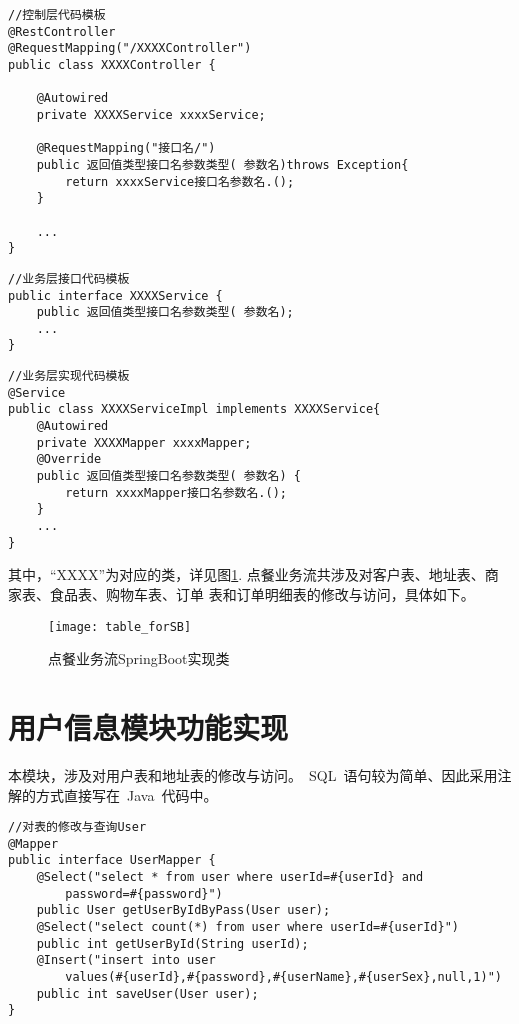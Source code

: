 \begin{lstlisting}[basicstyle=\footnotesize]
//控制层代码模板
@RestController
@RequestMapping("/XXXXController")
public class XXXXController {
    
    @Autowired
    private XXXXService xxxxService;

    @RequestMapping("接口名/")
    public 返回值类型接口名参数类型( 参数名)throws Exception{
        return xxxxService接口名参数名.();
    }
    
    ...
}
\end{lstlisting}

\begin{lstlisting}[basicstyle=\footnotesize]
//业务层接口代码模板
public interface XXXXService {
    public 返回值类型接口名参数类型( 参数名);
    ...
}
\end{lstlisting}

\begin{lstlisting}[basicstyle=\footnotesize]
//业务层实现代码模板
@Service
public class XXXXServiceImpl implements XXXXService{
    @Autowired
    private XXXXMapper xxxxMapper;
    @Override
    public 返回值类型接口名参数类型( 参数名) {
        return xxxxMapper接口名参数名.();
    }
    ...
}
\end{lstlisting}

其中，“XXXX”为对应的类，详见图\ref{fig:table_forSB}.
点餐业务流共涉及对客户表、地址表、商家表、食品表、购物车表、订单
表和订单明细表的修改与访问，具体如下。

\begin{figure}[htbp]
    \centering
    \texttt{[image: table\_forSB]}
    \caption{点餐业务流SpringBoot实现类}\label{fig:table_forSB}
    \vspace{\baselineskip}
\end{figure}

\section{用户信息模块功能实现}
本模块，涉及对用户表和地址表的修改与访问。~SQL~语句较为简单、因此采用注解的方式直接写在~Java~代码中。

\begin{lstlisting}[basicstyle=\footnotesize]
//对表的修改与查询User
@Mapper
public interface UserMapper {
    @Select("select * from user where userId=#{userId} and
        password=#{password}")
    public User getUserByIdByPass(User user);
    @Select("select count(*) from user where userId=#{userId}")
    public int getUserById(String userId);
    @Insert("insert into user
        values(#{userId},#{password},#{userName},#{userSex},null,1)")
    public int saveUser(User user);
}
\end{lstlisting}


